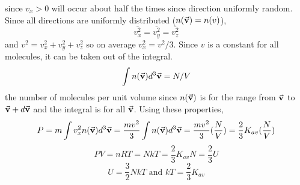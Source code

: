         since $v_x > 0$ will occur about half the times since direction uniformly random. 
        \newline \indent 
        Since all directions are uniformly distributed ($n(\va{v}) = n(v)$),
        \begin{equation*}
            \overline{v_x^2} = \overline{v_y^2} = \overline{v_z^2}
        \end{equation*}
        and $v^2 = v_x^2 + v_y^2 + v_z^2$ so on average $v_x^2 = v^2/3$. Since $v$ is a constant for all molecules, it can be taken out of the integral.
        \begin{equation*}
            \int n(\va{v})d^3\va{v} = N / V
        \end{equation*}
        the number of molecules per unit volume since $n(\va{v})$ is for the range from $\va{v}$ to $\va{v} + d\va{v}$ and the integral is for all $\va{v}$.
        \newline \indent
        Using these properties,
        \begin{equation*}
            P = m\int v_x^2 n(\va{v}) d^3\va{v} = \frac{mv^2}{3} \int n(\va{v})d^3\va{v} = \frac{mv^2}{3} (\frac{N}{V}) = \frac{2}{3}K_{av}(\frac{N}{V})
        \end{equation*}
        \begin{equation*}
            PV = nRT = NkT = \frac{2}{3}K_{av}N = \frac{2}{3}U
        \end{equation*}
        \begin{equation*}
            U = \frac{3}{2}NkT \text{ and } kT = \frac{2}{3}K_{av}
        \end{equation*}